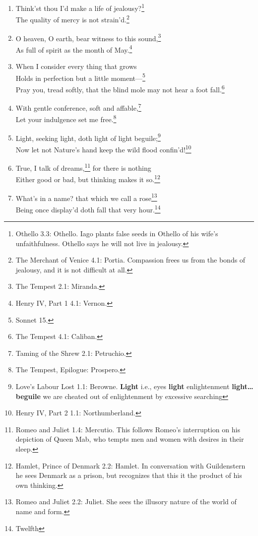 \documentclass[17pt,twoside]{extarticle}
\begin{document}
\begin{enumerate}
{    daughter Cordelia is not grateful to him. Kent, knowing her
    faithfulness, tries to intervene.}
\item
  Think'st thou I'd make a life of jealousy?\footnote{Othello 3.3:
    Othello. Iago plants false seeds in Othello of his wife's
    unfaithfulness. Othello says he will not live in jealousy.}\\The
  quality of mercy is not strain'd.\footnote{The Merchant of Venice 4.1:
    Portia. Compassion frees us from the bonds of jealousy, and it is
    not difficult at all.}
\item
  O heaven, O earth, bear witness to this sound,\footnote{The Tempest
    2.1: Miranda.}\\As full of spirit as the month of May.\footnote{Henry
    IV, Part 1 4.1: Vernon.}
\item
  When I consider every thing that grows\\Holds in perfection but a
  little moment---\footnote{Sonnet 15.}\\Pray you, tread softly, that
  the blind mole may not hear a foot fall.\footnote{The Tempest 4.1:
    Caliban.}
\item
  With gentle conference, soft and affable,\footnote{Taming of the Shrew
    2.1: Petruchio.}\\Let your indulgence set me free.\footnote{The
    Tempest, Epilogue: Prospero.}
\item
  Light, seeking light, doth light of light beguile;\footnote{Love's
    Labour Lost 1.1: Berowne. \textbf{Light} i.e., eyes \textbf{light}
    enlightenment \textbf{light\ldots{}beguile} we are cheated out of
    enlightenment by excessive searching}\\Now let not Nature's hand
  keep the wild flood confin'd!\footnote{Henry IV, Part 2 1.1:
    Northumberland.}
\item
  True, I talk of dreams,\footnote{Romeo and Juliet 1.4: Mercutio. This
    follows Romeo's interruption on his depiction of Queen Mab, who
    tempts men and women with desires in their sleep.} for there is
  nothing\\Either good or bad, but thinking makes it so.\footnote{Hamlet,
    Prince of Denmark 2.2: Hamlet. In conversation with Guildenstern he
    sees Denmark as a prison, but recognizes that this it the product of
    his own thinking.}
\item
  What's in a name? that which we call a rose\footnote{Romeo and Juliet
    2.2: Juliet. She sees the illusory nature of the world of name and
    form.}\\Being once display'd doth fall that very hour.\footnote{Twelfth
}
\end{enumerate}
\end{document}
